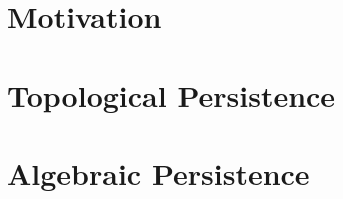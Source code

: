 \documentclass[b5paper, 11pt, twoside]{report}
\begin{document}
\newpage
\tableofcontents

\newpage
\listoffigures

\singlespacing
\chapter{Motivation}


\chapter{Topological Persistence}


\chapter{Algebraic Persistence}


\singlespacing
\printbibliography

\newpage
\printindex
\end{document}
